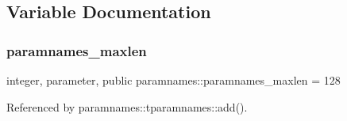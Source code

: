 \subsection{Variable Documentation}
\mbox{\label{namespaceparamnames_a4be152acd9c1eea95bdadaf3e5493495}} 
\subsubsection{\texorpdfstring{paramnames\+\_\+maxlen}{paramnames\_maxlen}}
{\footnotesize\ttfamily integer, parameter, public paramnames\+::paramnames\+\_\+maxlen = 128}



Referenced by paramnames\+::tparamnames\+::add().

